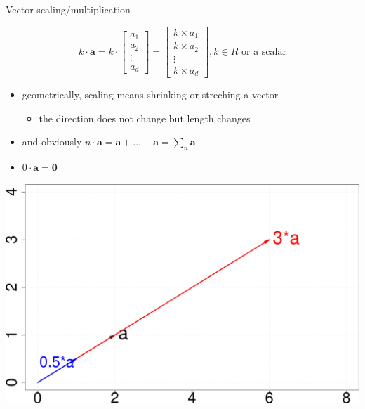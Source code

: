\documentclass[ignorenonframetext,]{beamer}
\providecommand{\tightlist}{%
  \setlength{\itemsep}{0pt}\setlength{\parskip}{0pt}}
\newcommand{\vv}[1]{\boldsymbol{#1}}
\begin{document}
\begin{frame}{Vector scaling/multiplication}
\protect\hypertarget{vector-scalingmultiplication}{}

\[k\cdot \vv{a} = k \cdot \begin{bmatrix}
           a_1 \\
           a_2 \\
           \vdots\\
           a_d
         \end{bmatrix} = \begin{bmatrix}
           k\times a_1 \\
           k\times a_2 \\
           \vdots\\
           k\times a_d
         \end{bmatrix}, k\in R \text{ or a scalar}\]

\begin{itemize}
\tightlist
\item
  geometrically, scaling means shrinking or streching a vector

  \begin{itemize}
  \tightlist
  \item
    the direction does not change but length changes
  \end{itemize}
\item
  and obviously \(n\cdot \vv{a} = \vv{a}+\ldots+ \vv{a}=\sum_n \vv{a}\)
\item
  \(0\cdot \vv{a} = \vv{0}\)
\end{itemize}

\begin{center}\includegraphics[width=0.6\linewidth]{math4ml_files/figure-beamer/unnamed-chunk-4-1} \end{center}

\end{frame}
\end{document}
